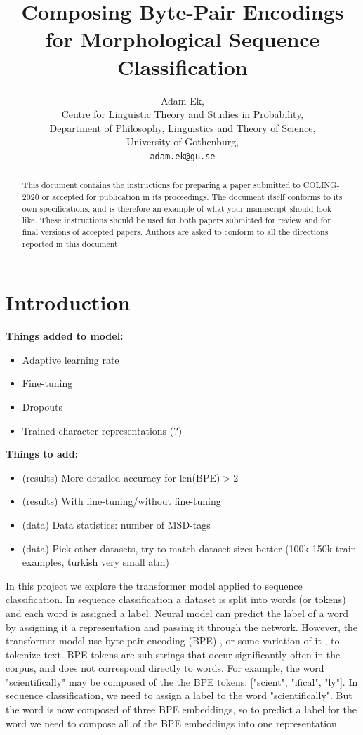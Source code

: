 \documentclass[11pt]{article}
\title{Composing Byte-Pair Encodings for Morphological Sequence Classification}
\author{Adam Ek,\\
	Centre for Linguistic Theory and Studies in Probability,\\
	Department of Philosophy, Linguistics and Theory of Science,\\
	University of Gothenburg,\\
	\texttt{adam.ek@gu.se}}
\date{}
\begin{document}
	\maketitle
	
	\begin{abstract}
		This document contains the instructions for preparing a paper submitted
		to COLING-2020 or accepted for publication in its proceedings. The document itself
		conforms to its own specifications, and is therefore an example of
		what your manuscript should look like. These instructions should be
		used for both papers submitted for review and for final versions of
		accepted papers. Authors are asked to conform to all the directions
		reported in this document.
	\end{abstract}
	
	\section{Introduction}
	\label{intro}
	
	\textbf{Things added to model:}
	\begin{itemize}
		\item Adaptive learning rate
		\item Fine-tuning
		\item Dropouts
		\item Trained character representations (?)
	\end{itemize}
	
	\textbf{Things to add:}
	\begin{itemize}
		\item (results) More detailed accuracy for len(BPE)$>2$
		\item (results) With fine-tuning/without fine-tuning
		\item (data) Data statistics: number of MSD-tags 
		\item (data) Pick other datasets, try to match dataset sizes better (100k-150k train examples, turkish very small atm)
	\end{itemize}
    
    In this project we explore the transformer model applied to sequence classification. In sequence classification a dataset is split into words (or tokens) and each word is assigned a label. 
    Neural model can predict the label of a word by assigning it a representation and passing it through the network. However, the transformer model use byte-pair encoding (BPE) \cite{sennrich2015neural}, or some variation of it \citep{devlin2018bert}, to tokenize text. 
    BPE tokens are sub-strings that occur significantly often in the corpus, and does not correspond directly to words. For example, the word "scientifically" may be composed of the the BPE tokens: ["scient", "ifical", "ly"].
    In sequence classification, we need to assign a label to the word "scientifically". But the word is now composed of three BPE embeddings, so to predict a label for the word we need to compose all of the BPE embeddings into one representation.
    
\end{document}
